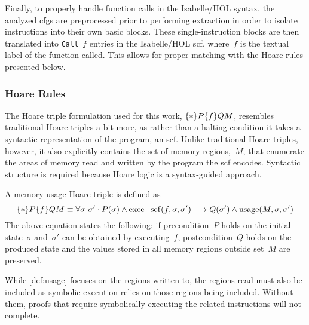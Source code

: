 Finally, to properly handle function calls in the Isabelle/HOL syntax,
the analyzed \acp{cfg} are preprocessed prior to performing extraction
in order to isolate  instructions into their own basic blocks.
These single-instruction blocks are then translated into \texttt{Call}~$f$ entries
in the Isabelle/HOL \ac{scf}, where~$f$ is the textual label of the function called.
This allows for proper matching with the Hoare rules presented below.

\subsubsection{Hoare Rules}\label{scf_hoare}
The Hoare triple formulation used for this work, $\{*\}P\{f\}{Q}M$,
resembles traditional Hoare triples a bit more,%
as rather than a halting condition
it takes a syntactic representation of the program, an \ac{scf}.
Unlike traditional Hoare triples, however,
it also explicitly contains the set of memory regions,~$M$,
that enumerate the areas of memory read and written by the program
the \ac{scf} encodes.
Syntactic structure is required because Hoare logic is a syntax-guided approach.
\begin{definition}\label{def:usage}
  A memory usage Hoare triple is defined as
  \begin{equation}
    \{*\}P\{f\}{Q}{M}\equiv
    \forall\sigma~\sigma'\cdot P(\sigma)\wedge\operatorname{exec\_scf}(f,\sigma,\sigma')\longrightarrow
    Q(\sigma')\wedge\operatorname{usage}(M,\sigma,\sigma')
  \end{equation}
  The above equation states the following:
  if precondition~$P$ holds on the initial state~$\sigma$
  and~$\sigma'$ can be obtained by executing~$f$,
  postcondition~$Q$ holds on the produced state
  and the values stored in all memory regions outside set~$M$ are preserved.
\end{definition}
\begin{example}
\end{example}
While \cref{def:usage} focuses on the regions written to,
the regions read must also be included as symbolic execution
relies on those regions being included.
Without them, proofs that require symbolically executing
the related instructions will not complete.
